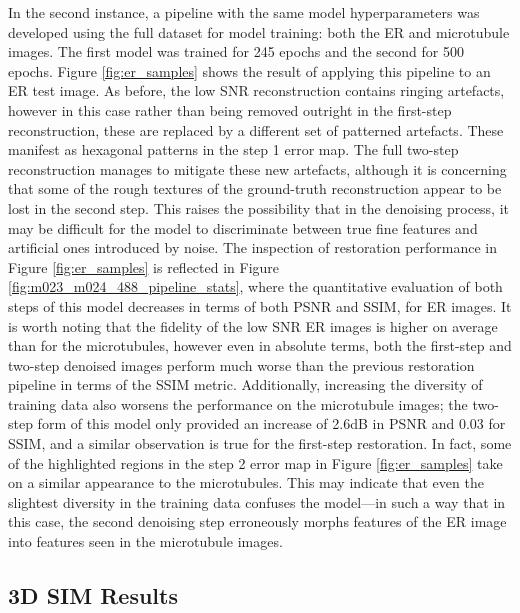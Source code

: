 \documentclass[12pt]{article}
\begin{document}
In the second instance, a pipeline with the same model hyperparameters was developed using the full dataset for model training:
both the ER and microtubule images.
The first model was trained for 245 epochs and the second for 500 epochs.
Figure \ref{fig:er_samples} shows the result of applying this pipeline to an ER test image.
As before, the low SNR reconstruction contains ringing artefacts,
however in this case rather than being removed outright in the first-step reconstruction,
these are replaced by a different set of patterned artefacts.
These manifest as hexagonal patterns in the step 1 error map.
The full two-step reconstruction manages to mitigate these new artefacts,
although it is concerning that some of the rough textures of the ground-truth reconstruction appear to be lost in the second step.
This raises the possibility that in the denoising process,
it may be difficult for the model to discriminate between true fine features and artificial ones introduced by noise.
The inspection of restoration performance in Figure \ref{fig:er_samples} is reflected in Figure \ref{fig:m023_m024_488_pipeline_stats},
where the quantitative evaluation of both steps of this model decreases in terms of both PSNR and SSIM, for ER images.
It is worth noting that the fidelity of the low SNR ER images is higher on average than for the microtubules,
however even in absolute terms, both the first-step and two-step denoised images perform much worse than the previous restoration pipeline in terms of the SSIM metric.
Additionally, increasing the diversity of training data also worsens the performance on the microtubule images;
the two-step form of this model only provided an increase of 2.6dB in PSNR and 0.03 for SSIM,
and a similar observation is true for the first-step restoration.
In fact, some of the highlighted regions in the step 2 error map in Figure \ref{fig:er_samples} take on a similar appearance to the microtubules.
This may indicate that even the slightest diversity in the training data confuses the model---in
such a way that in this case,
the second denoising step erroneously morphs features of the ER image into features seen in the microtubule images.

\subsection{3D SIM Results}
\end{document}
